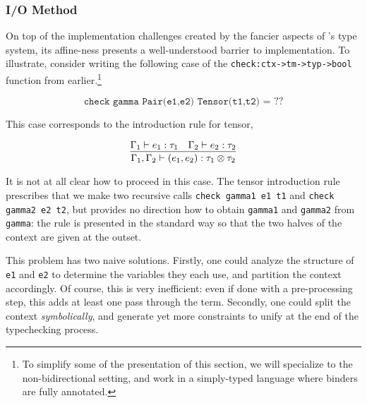 
\subsubsection{I/O Method}
\label{sec:bilambdaamor-overview-io}
On top of the implementation challenges created by the fancier aspects of \dlambdaamor's type system, its affine-ness presents a well-understood barrier to implementation. To illustrate, consider writing the following case of the \texttt{check:ctx->tm->typ->bool} function from earlier.\footnote{
To simplify some of the presentation of this section, we will specialize to the non-bidirectional setting, and work in a simply-typed language where binders are fully annotated.
}

$$
\texttt{check gamma Pair(e1,e2) Tensor(t1,t2) = } ??
$$

This case corresponds to the introduction rule for tensor,

$$
\infer{\Gamma_1,\Gamma_2 \vdash (e_1,e_2) : \tau_1 \otimes \tau_2}{\Gamma_1 \vdash e_1 : \tau_1 & \Gamma_2 \vdash e_2 : \tau_2}
$$


It is not at all clear how to proceed in this case. The tensor introduction rule prescribes that we make two recursive calls \texttt{check gamma1 e1 t1} and \texttt{check gamma2 e2 t2}, but provides no direction how to obtain \texttt{gamma1} and \texttt{gamma2} from \texttt{gamma}: the rule is presented in the standard way so that the two halves of the context are given at the outset.

This problem has two naive solutions. Firstly, one could analyze the structure of \texttt{e1} and \texttt{e2} to determine the variables they each use, and partition the context accordingly. Of course, this is very inefficient: even if done with a pre-processing step, this adds at least one pass through the term. Secondly, one could split the context \textit{symbolically}, and generate yet more constraints to unify at the end of the typechecking process.

